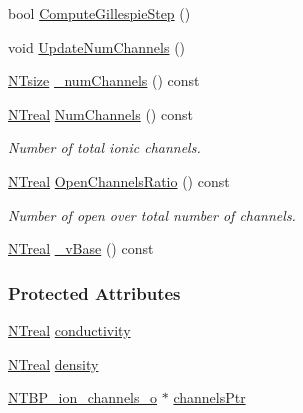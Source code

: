 \begin{DoxyCompactItemize}
bool \hyperlink{class_n_t_b_p__multi__current__o_a3d074286c21c5b967fe280a6d469cb1e}{ComputeGillespieStep} ()
\item 
void \hyperlink{class_n_t_b_p__multi__current__o_a06bd13e526fc7fb87a9b64193bece02c}{UpdateNumChannels} ()
\item 
\hyperlink{nt__types_8h_a06c124f2e4469769b58230253ce0560b}{NTsize} \hyperlink{class_n_t_b_p__multi__current__o_ac398e9c9fe43c9e86e4752d32512a338}{\_\-numChannels} () const 
\item 
\hyperlink{nt__types_8h_a814a97893e9deb1eedcc7604529ba80d}{NTreal} \hyperlink{class_n_t_b_p__multi__current__o_a93488c1e39f6c3bb67d548b778fcd1b3}{NumChannels} () const 
\begin{DoxyCompactList}\small\item\em Number of total ionic channels. \item\end{DoxyCompactList}\item 
\hyperlink{nt__types_8h_a814a97893e9deb1eedcc7604529ba80d}{NTreal} \hyperlink{class_n_t_b_p__multi__current__o_a9e39722b1f3fedc5fbb89d19009c3a70}{OpenChannelsRatio} () const 
\begin{DoxyCompactList}\small\item\em Number of open over total number of channels. \item\end{DoxyCompactList}\item 
\hyperlink{nt__types_8h_a814a97893e9deb1eedcc7604529ba80d}{NTreal} \hyperlink{class_n_t_b_p__multi__current__o_adfb31172a9ce5fd6626f35cf5c6247f3}{\_\-vBase} () const 
\end{DoxyCompactItemize}
\subsubsection*{Protected Attributes}
\begin{DoxyCompactItemize}
\item 
\hyperlink{nt__types_8h_a814a97893e9deb1eedcc7604529ba80d}{NTreal} \hyperlink{class_n_t_b_p__multi__current__o_aa28a5de6d10d258e251e73bf1dcaba0d}{conductivity}
\item 
\hyperlink{nt__types_8h_a814a97893e9deb1eedcc7604529ba80d}{NTreal} \hyperlink{class_n_t_b_p__multi__current__o_a82138baaa276b09c13038ca1fd6f08a7}{density}
\item 
\hyperlink{class_n_t_b_p__ion__channels__o}{NTBP\_\-ion\_\-channels\_\-o} $\ast$ \hyperlink{class_n_t_b_p__multi__current__o_a5c9a87bdd19198d7be99bda0d9bbe6b1}{channelsPtr}
\end{DoxyCompactItemize}
